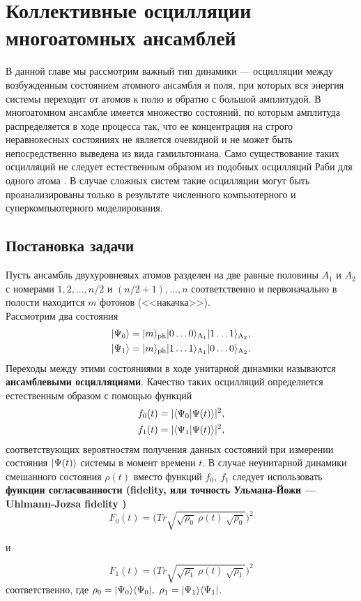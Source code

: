 \chapter{Коллективные осцилляции многоатомных ансамблей}\label{ch:ch1}
В данной главе мы рассмотрим важный тип динамики --- осцилляции между возбужденным состоянием атомного ансамбля и поля, при которых вся энергия системы переходит от атомов к полю и обратно с большой амплитудой. В многоатомном ансамбле имеется множество состояний, по которым амплитуда распределяется в ходе процесса так, что ее концентрация на строго неравновесных состояниях не является очевидной и не может быть непосредственно выведена из вида гамильтониана. Само существование таких осцилляций не следует естественным образом из подобных осцилляций Раби для одного атома \cite{rabi_1,rabi_2,rabi_3,rabi_4}. В случае сложных систем такие осцилляции могут быть проанализированы только в результате численного компьютерного и суперкомпьютерного моделирования.

\section{Постановка задачи}\label{sec:ch1/sec1}
\noindent Пусть ансамбль двухуровневых атомов разделен на две равные половины $A_1$ и $A_2$ с номерами $1,2,...,n/2$ и $(n/2+1),\dots,n$ соответственно и первоначально в полости находится $m$ фотонов (<<накачка>>).
\\[12pt]
Рассмотрим два состояния
\begin{equation}\label{main}
	\begin{split}
		|\Psi_0\rangle=|m\rangle_{\mathrm{ph}}|0\dots0\rangle_{\mathrm{A_{1}}} |1\dots1\rangle_{\mathrm{A_{2}}},\\
		|\Psi_1\rangle=|m\rangle_{\mathrm{ph}}|1\dots1\rangle_{\mathrm{A_{1}}} |0\dots0\rangle_{\mathrm{A_{2}}}.
	\end{split}
\end{equation}
Переходы между этими состояниями в ходе унитарной динамики называются \textbf{ансамблевыми осцилляциями}. Качество таких осцилляций определяется естественным образом с помощью функций 
\begin{equation}
	\begin{split}
		\displaystyle f_0(t)=|\langle \Psi_0 |\Psi(t)\rangle |^2,\\f_1(t)=|\langle \Psi_1 |\Psi(t)\rangle |^2,
	\end{split}
\end{equation}
соответствующих вероятностям получения данных состояний при измерении состояния $|\Psi(t)\rangle$ системы в момент времени $t$. В случае неунитарной динамики смешанного состояния $\rho(t)$ вместо функций $f_0, \ f_1$ следует использовать \textbf{функции согласованности (fidelity, или точность Ульмана-Йожи --- Uhlmann-Jozsa fidelity \cite{fidelity_1,fidelity_2,fidelity_3,fidelity_4})}
\[
F_0(t)=\biggl(Tr\sqrt{\sqrt{\rho_0}\ \rho(t)\ \sqrt{\rho_0}}\biggr)^{2}
\]
\begin{center}и\end{center}
\[
F_1(t)=\biggl(Tr\sqrt{\sqrt{\rho_1}\ \rho(t)\ \sqrt{\rho_1}}\biggr)^{2}
\]
соответственно, где $\rho_0=|\Psi_0\ra\la\Psi_0|,\ \rho_1=|\Psi_1\ra\la\Psi_1|$. 

